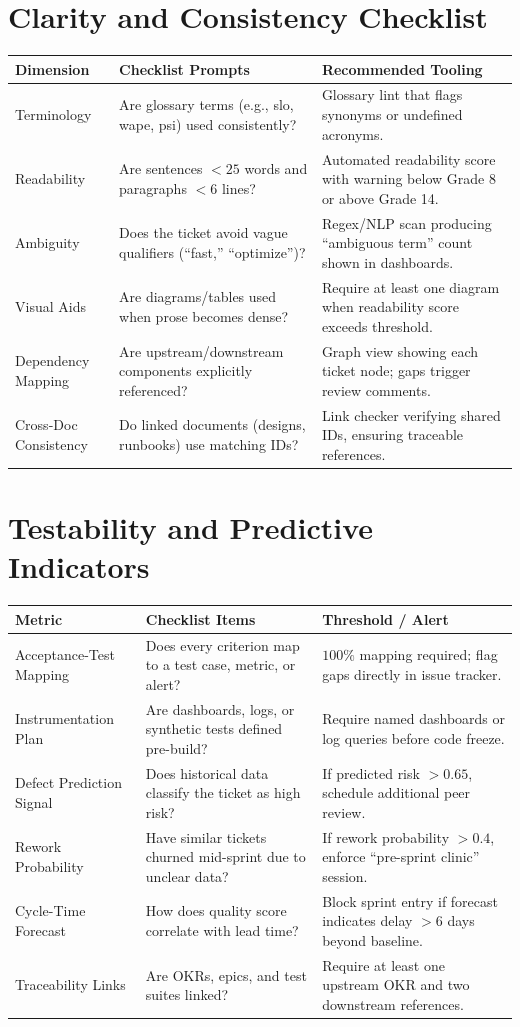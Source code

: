 \section{Clarity and Consistency Checklist}
\begin{longtable}{p{}p{}p{}}
\toprule
\textbf{Dimension} & \textbf{Checklist Prompts} & \textbf{Recommended Tooling}\\
\midrule
Terminology & Are glossary terms (e.g., \gls{slo}, \gls{wape}, \gls{psi}) used consistently? & Glossary lint that flags synonyms or undefined acronyms.\\
Readability & Are sentences $<25$ words and paragraphs $<6$ lines? & Automated readability score with warning below Grade 8 or above Grade 14.\\
Ambiguity & Does the ticket avoid vague qualifiers (``fast,'' ``optimize'')? & Regex/NLP scan producing ``ambiguous term'' count shown in dashboards.\\
Visual Aids & Are diagrams/tables used when prose becomes dense? & Require at least one diagram when readability score exceeds threshold.\\
Dependency Mapping & Are upstream/downstream components explicitly referenced? & Graph view showing each ticket node; gaps trigger review comments.\\
Cross-Doc Consistency & Do linked documents (designs, runbooks) use matching IDs? & Link checker verifying shared IDs, ensuring traceable references.\\
\bottomrule
\end{longtable}

\section{Testability and Predictive Indicators}
\begin{longtable}{p{}p{}p{}}
\toprule
\textbf{Metric} & \textbf{Checklist Items} & \textbf{Threshold / Alert}\\
\midrule
Acceptance-Test Mapping & Does every criterion map to a test case, metric, or alert? & $100\%$ mapping required; flag gaps directly in issue tracker.\\
Instrumentation Plan & Are dashboards, logs, or synthetic tests defined pre-build? & Require named dashboards or log queries before code freeze.\\
Defect Prediction Signal & Does historical data classify the ticket as high risk? & If predicted risk $>0.65$, schedule additional peer review.\\
Rework Probability & Have similar tickets churned mid-sprint due to unclear data? & If rework probability $>0.4$, enforce ``pre-sprint clinic'' session.\\
Cycle-Time Forecast & How does quality score correlate with lead time? & Block sprint entry if forecast indicates delay $>6$ days beyond baseline.\\
Traceability Links & Are OKRs, epics, and test suites linked? & Require at least one upstream OKR and two downstream references.\\
\bottomrule
\end{longtable}

